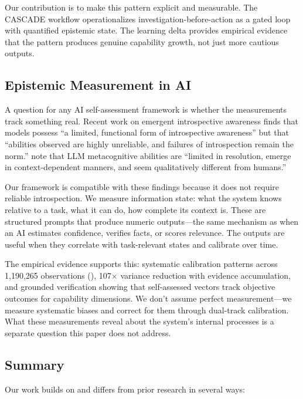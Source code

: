 Our contribution is to make this pattern explicit and measurable. The CASCADE workflow operationalizes investigation-before-action as a gated loop with quantified epistemic state. The learning delta provides empirical evidence that the pattern produces genuine capability growth, not just more cautious outputs.

\subsection{Epistemic Measurement in AI}

A question for any AI self-assessment framework is whether the measurements track something real. Recent work on emergent introspective awareness \citep{bricken2025introspection} finds that models possess ``a limited, functional form of introspective awareness'' but that ``abilities observed are highly unreliable, and failures of introspection remain the norm.'' \citet{steyvers2025metacognition} note that LLM metacognitive abilities are ``limited in resolution, emerge in context-dependent manners, and seem qualitatively different from humans.''

Our framework is compatible with these findings because it does not require reliable introspection. We measure information state: what the system knows relative to a task, what it can do, how complete its context is. These are structured prompts that produce numeric outputs---the same mechanism as when an AI estimates confidence, verifies facts, or scores relevance. The outputs are useful when they correlate with task-relevant states and calibrate over time.

The empirical evidence supports this: systematic calibration patterns across 1,190,265 observations (), 107$\times$ variance reduction with evidence accumulation, and grounded verification showing that self-assessed vectors track objective outcomes for capability dimensions. We don't assume perfect measurement---we measure systematic biases and correct for them through dual-track calibration. What these measurements reveal about the system's internal processes is a separate question this paper does not address.

\subsection{Summary}

Our work builds on and differs from prior research in several ways:

